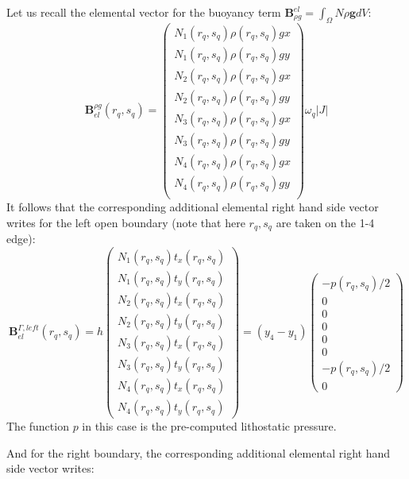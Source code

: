 Let us recall the elemental vector for the buoyancy term 
${\bm B}_{\rho g}^{el}=\int_\Omega N \rho {\bm g}dV$:
\[
{\bm B}_{el}^{\rho g}(r_q,s_q) =
\left(
\begin{array}{c}
N_1(r_q,s_q) \rho(r_q,s_q) gx\\
N_1(r_q,s_q) \rho(r_q,s_q) gy\\
N_2(r_q,s_q) \rho(r_q,s_q) gx\\
N_2(r_q,s_q) \rho(r_q,s_q) gy\\
N_3(r_q,s_q) \rho(r_q,s_q) gx\\
N_3(r_q,s_q) \rho(r_q,s_q) gy\\
N_4(r_q,s_q) \rho(r_q,s_q) gx\\
N_4(r_q,s_q) \rho(r_q,s_q) gy\\
\end{array}
\right)
\omega_q |J|
\] 
It follows that the corresponding additional elemental right hand side vector writes
for the left open boundary (note that here $r_q,s_q$ are taken on the 1-4 edge):
\[
{\bm B}^{\Gamma,left}_{el}(r_q,s_q) =
h
\left(
\begin{array}{c}
N_1(r_q,s_q) t_x(r_q,s_q) \\
N_1(r_q,s_q) t_y(r_q,s_q) \\
N_2(r_q,s_q) t_x(r_q,s_q) \\
N_2(r_q,s_q) t_y(r_q,s_q) \\
N_3(r_q,s_q) t_x(r_q,s_q) \\
N_3(r_q,s_q) t_y(r_q,s_q) \\
N_4(r_q,s_q) t_x(r_q,s_q) \\
N_4(r_q,s_q) t_y(r_q,s_q) 
\end{array}
\right)
=
(y_4-y_1)
\left(
\begin{array}{c}
-p(r_q,s_q)/2 \\
0\\
0\\
0\\
0\\
0\\
-p(r_q,s_q)/2 \\
0
\end{array}
\right)
\] 
The function $p$ in this case is the pre-computed lithostatic pressure.

And for the right boundary, the corresponding additional elemental right hand side vector writes:

